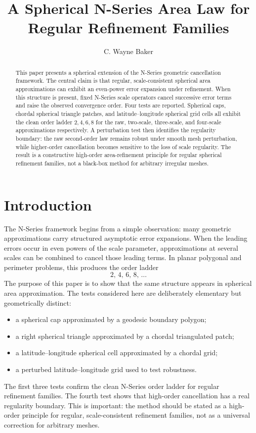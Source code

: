 \documentclass[11pt]{article}
\title{A Spherical N-Series Area Law for Regular Refinement Families}
\author{C. Wayne Baker}
\date{}
\begin{document}
\maketitle

\begin{abstract}
This paper presents a spherical extension of the N-Series geometric cancellation
framework. The central claim is that regular, scale-consistent spherical area
approximations can exhibit an even-power error expansion under refinement. When this
structure is present, fixed N-Series scale operators cancel successive error terms and
raise the observed convergence order. Four tests are reported. Spherical caps, chordal
spherical triangle patches, and latitude--longitude spherical grid cells all exhibit the
clean order ladder $2,4,6,8$ for the raw, two-scale, three-scale, and four-scale
approximations respectively. A perturbation test then identifies the regularity boundary:
the raw second-order law remains robust under smooth mesh perturbation, while higher-order
cancellation becomes sensitive to the loss of scale regularity. The result is a
constructive high-order area-refinement principle for regular spherical refinement
families, not a black-box method for arbitrary irregular meshes.
\end{abstract}

\section{Introduction}
The N-Series framework begins from a simple observation: many geometric approximations
carry structured asymptotic error expansions. When the leading errors occur in even powers
of the scale parameter, approximations at several scales can be combined to cancel those
leading terms. In planar polygonal and perimeter problems, this produces the order ladder
\[
2,\,4,\,6,\,8,\,\dots
\]
The purpose of this paper is to show that the same structure appears in spherical area
approximation. The tests considered here are deliberately elementary but geometrically
distinct:
\begin{itemize}
  \item a spherical cap approximated by a geodesic boundary polygon;
  \item a right spherical triangle approximated by a chordal triangulated patch;
  \item a latitude--longitude spherical cell approximated by a chordal grid;
  \item a perturbed latitude--longitude grid used to test robustness.
\end{itemize}
The first three tests confirm the clean N-Series order ladder for regular refinement
families. The fourth test shows that high-order cancellation has a real regularity
boundary. This is important: the method should be stated as a high-order principle for
regular, scale-consistent refinement families, not as a universal correction for arbitrary
meshes.
\end{document}
